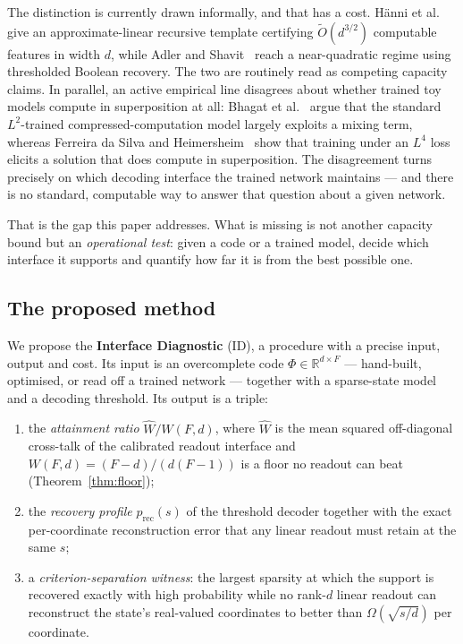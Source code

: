 \documentclass[preprint,12pt]{elsarticle}
\theoremstyle{definition}
\newcommand{\Otilde}{\widetilde{O}}
\newcommand{\R}{\mathbb{R}}
\begin{document}
The distinction is currently drawn informally, and that has a cost. H\"{a}nni et
al.~\cite{hanni2024superposition} give an approximate-linear recursive template certifying
$\Otilde(d^{3/2})$ computable features in width $d$, while Adler and
Shavit~\cite{adler2024superposition} reach a near-quadratic regime using thresholded Boolean
recovery. The two are routinely read as competing capacity claims. In parallel, an active
empirical line disagrees about whether trained toy models compute in superposition at all:
Bhagat et al.~\cite{bhagat2026cc} argue that the standard $L^2$-trained compressed-computation
model largely exploits a mixing term, whereas Ferreira da Silva and
Heimersheim~\cite{ferreiradasilva2026l4} show that training under an $L^4$ loss elicits a
solution that does compute in superposition. The disagreement turns precisely on which
decoding interface the trained network maintains --- and there is no standard, computable way
to answer that question about a given network.

That is the gap this paper addresses. What is missing is not another capacity bound but an
\emph{operational test}: given a code or a trained model, decide which interface it supports
and quantify how far it is from the best possible one.

\subsection{The proposed method}

We propose the \textbf{Interface Diagnostic} (ID), a procedure with a precise input, output
and cost. Its input is an overcomplete code $\Phi\in\R^{d\times F}$ --- hand-built, optimised,
or read off a trained network --- together with a sparse-state model and a decoding threshold.
Its output is a triple:

\begin{enumerate}[leftmargin=*,itemsep=1pt]
\item the \emph{attainment ratio} $\widehat W/W(F,d)$, where $\widehat W$ is the mean squared
  off-diagonal cross-talk of the calibrated readout interface and $W(F,d)=(F-d)/(d(F-1))$ is
  a floor no readout can beat (Theorem~\ref{thm:floor});
\item the \emph{recovery profile} $p_{\mathrm{rec}}(s)$ of the threshold decoder together with
  the exact per-coordinate reconstruction error that any linear readout must retain at the
  same $s$;
\item a \emph{criterion-separation witness}: the largest sparsity at which the support is
  recovered exactly with high probability while no rank-$d$ linear readout can reconstruct the
  state's real-valued coordinates to better than $\Omega(\sqrt{s/d})$ per coordinate.
\end{enumerate}
\end{document}

